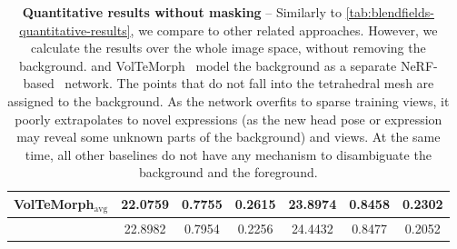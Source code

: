 \begin{table}[!t]
{\begin{tabular}{lcccccc}
      VolTeMorph$_\text{avg}$\cite{garbin2022voltemorph} & \cellcolor{secondbestcolor}22.0759     & \cellcolor{secondbestcolor}0.7755        & \cellcolor{secondbestcolor}0.2615 & \cellcolor{secondbestcolor}23.8974 & \cellcolor{secondbestcolor}0.8458 & 0.2302                            \\
      \midrule
      \textbf{\methodname{}}                             & \cellcolor{firstbestcolor}22.8982      & \cellcolor{firstbestcolor}0.7954         & \cellcolor{firstbestcolor}0.2256  & \cellcolor{firstbestcolor}24.4432  & \cellcolor{firstbestcolor}0.8477  & \cellcolor{firstbestcolor}0.2052  \\
      \bottomrule
    \end{tabular}
  }
  \caption{\textbf{Quantitative results without masking} --
    Similarly to \cref{tab:blendfields-quantitative-results}, we compare \blendfields to other related approaches.
    However, we calculate the results over the whole image space, without
    removing the background.
    \blendfields and VolTeMorph~\cite{garbin2024voltemorph} model the background as a separate NeRF-based~\cite{mildenhall2020nerf} network.
    The points that do not fall into the tetrahedral mesh are assigned to the
    background.
    As the network overfits to sparse training views, it poorly extrapolates
    to novel expressions (as the new head pose or expression may reveal some
    unknown parts of the background) and views.
    At the same time, all other baselines do not have any mechanism to
    disambiguate the background and the foreground.
  }
  \label{tab:blendfields-quantitative-results-without-masking}
\end{table}